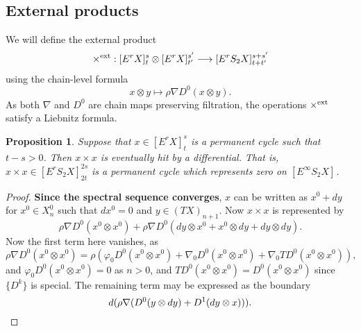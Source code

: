 \documentclass[11pt]{amsart}
\theoremstyle{plain}
\newtheorem{prop}[thm]{Proposition}
\theoremstyle{definition}
\let\phi\varphi
\renewcommand{\to}{\longrightarrow}
\theoremstyle{plain}
\newcommand{\Nabla}{\nabla}
\newcommand{\E}[5]{[E^{#1}_{#2}#3]^{#4}_{#5}}
\begin{document}
\begin{second quadrant homotopy}
\subsection{External products}
We will define the external product
\[\times^\textup{ext}:\E{r}{}{X}{s}{t}\otimes \E{r}{}{X}{s'}{t'}\to \E{r}{}{S_2X}{s+s'}{t+t'}\]
using the chain-level formula
\[x\otimes y\mapsto\rho\Nabla D^0(x\otimes y).\]
As both $\Nabla$ and $D^0$ are chain maps preserving filtration, the operations $\times^\textup{ext}$ satisfy a Liebnitz formula.
\begin{prop}
Suppose that $x\in \E{r}{}{X}{s}{t}$ is a permanent cycle such that $t-s>0$. Then $x\times x$ is eventually hit by a differential. That is, $x\times x\in \E{r}{}{S_2X}{2s}{2t}$ is a permanent cycle which represents zero on $\E{\infty}{}{S_2X}{}{}$.
\end{prop}
\begin{proof}
\textbf{Since the spectral sequence converges}, $x$ can be written as $x^0+dy$ for $x^0\in X^{0}_{n}$ such that $dx^0=0$ and $y\in (TX)_{n+1}$. Now $x\times x$ is represented by
\[\rho\Nabla D^0(x^0\otimes x^0)+\rho\Nabla D^0(dy\otimes x^0+x^0\otimes dy+dy\otimes dy).\]
Now the first term here vanishes, as
\[\rho\Nabla D^0(x^0\otimes x^0)=\rho(\phi_0 D^0(x^0\otimes x^0)+\Nabla_0 D^0(x^0\otimes x^0)+\Nabla_0 TD^0(x^0\otimes x^0)),\]
and $\phi_0D^0(x^0\otimes x^0)=0$ as $n>0$, and $TD^0(x^0\otimes x^0)=D^0(x^0\otimes x^0)$ since $\{D^k\}$ is special. The remaining term may be expressed as the boundary
\[d(\rho\Nabla(D^0(y\otimes dy)+D^1(dy\otimes x))).\qedhere\]
\end{proof}

\end{second quadrant homotopy}
\end{document}

